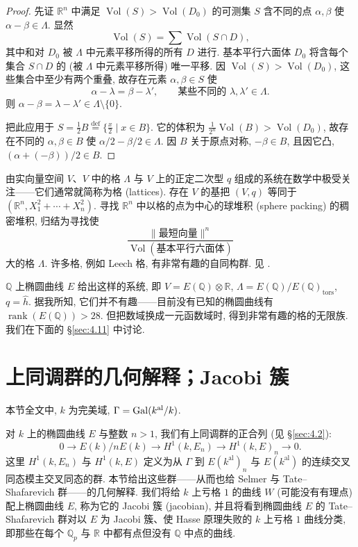 \begin{proof}
先证 $\mathbb{R}^n$ 中满足 $\operatorname{Vol}(S) > \operatorname{Vol}(D_0)$ 的可测集 $S$ 含不同的点 $\alpha, \beta$ 使 $\alpha-\beta\in\Lambda$. 显然
\[
\operatorname{Vol}(S) = \sum\operatorname{Vol}(S\cap D),
\]
其中和对 $D_0$ 被 $\Lambda$ 中元素平移所得的所有 $D$ 进行. 基本平行六面体 $D_0$ 将含每个集合 $S\cap D$ 的 (被 $\Lambda$ 中元素平移所得) 唯一平移. 因 $\operatorname{Vol}(S) > \operatorname{Vol}(D_0)$, 这些集合中至少有两个重叠, 故存在元素 $\alpha, \beta\in S$ 使
\[
\alpha - \lambda = \beta - \lambda', \qquad \text{某些不同的 } \lambda, \lambda'\in\Lambda.
\]
则 $\alpha-\beta = \lambda-\lambda'\in\Lambda\setminus\{0\}$.

把此应用于 $S = \frac{1}{2}B \overset{\text{def}}{=} \{\frac{x}{2} \mid x\in B\}$. 它的体积为 $\frac{1}{2^n}\operatorname{Vol}(B) > \operatorname{Vol}(D_0)$, 故存在不同的 $\alpha, \beta\in B$ 使 $\alpha/2 - \beta/2\in\Lambda$. 因 $B$ 关于原点对称, $-\beta\in B$, 且因它凸, $(\alpha + (-\beta))/2\in B$.
\end{proof}

\begin{remark} \label{thm:4.6.4} 
由实向量空间 $V$、$V$ 中的格 $\Lambda$ 与 $V$ 上的正定二次型 $q$ 组成的系统在数学中极受关注——它们通常就简称为格 (lattices). 存在 $V$ 的基把 $(V, q)$ 等同于 $(\mathbb{R}^n, X_1^2 + \cdots + X_n^2)$. 寻找 $\mathbb{R}^n$ 中以格的点为中心的球堆积 (sphere packing) 的稠密堆积, 归结为寻找使
\[
\frac{\|\text{最短向量}\|^n}{\operatorname{Vol}(\text{基本平行六面体})}
\]
大的格 $\Lambda$. 许多格, 例如 Leech 格, 有非常有趣的自同构群. 见 \cite{conway1999}.

$\mathbb{Q}$ 上椭圆曲线 $E$ 给出这样的系统, 即 $V = E(\mathbb{Q})\otimes\mathbb{R}$, $\Lambda = E(\mathbb{Q})/E(\mathbb{Q})_{\mathrm{tors}}$, $q = \hat{h}$. 据我所知, 它们并不有趣——目前没有已知的椭圆曲线有 $\operatorname{rank}(E(\mathbb{Q})) > 28$. 但把数域换成一元函数域时, 得到非常有趣的格的无限族. 我们在下面的 \S\ref{sec:4.11} 中讨论.
\end{remark}

\section{上同调群的几何解释；Jacobi 簇}\label{sec:4.7}

本节全文中, $k$ 为完美域, $\Gamma = \operatorname{Gal}(k^{\mathrm{al}}/k)$.

对 $k$ 上的椭圆曲线 $E$ 与整数 $n > 1$, 我们有上同调群的正合列 (见 \S\ref{sec:4.2}):
\[
0\to E(k)/nE(k)\to H^1(k, E_n)\to H^1(k, E)_n\to 0.
\]
这里 $H^1(k, E_n)$ 与 $H^1(k, E)$ 定义为从 $\Gamma$ 到 $E(k^{\mathrm{al}})_n$ 与 $E(k^{\mathrm{al}})$ 的连续交叉同态模主交叉同态的群. 本节给出这些群——从而也给 Selmer 与 Tate--Shafarevich 群——的几何解释. 我们将给 $k$ 上亏格 $1$ 的曲线 $W$ (可能没有有理点) 配上椭圆曲线 $E$, 称为它的 Jacobi 簇 (jacobian), 并且将看到椭圆曲线 $E$ 的 Tate--Shafarevich 群对以 $E$ 为 Jacobi 簇、使 Hasse 原理失败的 $k$ 上亏格 $1$ 曲线分类, 即那些在每个 $\mathbb{Q}_p$ 与 $\mathbb{R}$ 中都有点但没有 $\mathbb{Q}$ 中点的曲线.

